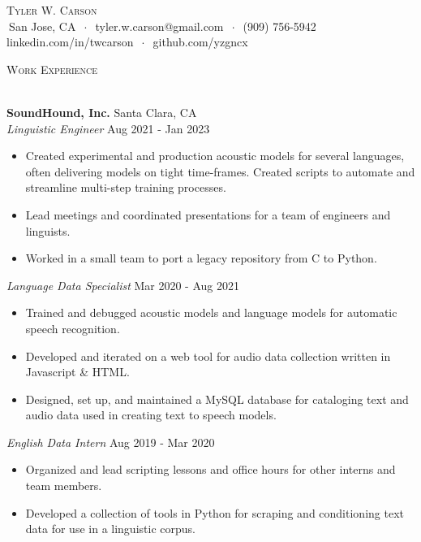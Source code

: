 \documentclass[]{article}
\newcommand{\lineunder} {
    \vspace*{-8pt} \\
    \hspace*{-18pt} \hrulefill \\
}
\newcommand{\header} [1] {
    {\hspace*{-18pt}\vspace*{6pt} \textsc{#1}}
    \vspace*{-6pt} \lineunder
}
\begin{document}
\vspace*{-40pt}


\vspace*{-10pt}
\begin{center}
	{\Huge \scshape {Tyler W. Carson}}\\
	$\ $San Jose, CA $\ \cdot\ $ tyler.w.carson@gmail.com $\ \cdot\ $ (909) 756-5942\\ linkedin.com/in/twcarson $\ \cdot\ $ github.com/yzgncx\\
\end{center}


\header{Work Experience}
\vspace{1mm}

\textbf{SoundHound, Inc.} \hfill Santa Clara, CA\\
\textit{Linguistic Engineer} \hfill Aug 2021 - Jan 2023\\
\vspace{-3mm}
\begin{itemize} \itemsep 0pt
	\item Created experimental and production acoustic models for several languages, often delivering models on tight time-frames.  Created scripts to automate and streamline multi-step training processes.
	\item Lead meetings and coordinated presentations for a team of engineers and linguists.
	\item Worked in a small team to port a legacy repository from C to Python. 
\end{itemize}
\textit{Language Data Specialist} \hfill Mar 2020 - Aug 2021\\
\vspace{-3mm}
\begin{itemize} \itemsep 0pt
	\item Trained and debugged acoustic models and language models for automatic speech recognition.  
	\item Developed and iterated on a web tool for audio data collection written in Javascript \& HTML.
	\item Designed, set up, and maintained a MySQL database for cataloging text and audio data used in creating text to speech models.
\end{itemize}
\textit{English Data Intern} \hfill Aug 2019 - Mar 2020\\
\vspace{-3mm}
\begin{itemize} \itemsep 0pt
	\item Organized and lead scripting lessons and office hours for other interns and team members.
	\item Developed a collection of tools in Python for scraping and conditioning text data for use in a linguistic corpus.
\end{itemize}
\vspace{1mm}
\end{document}
